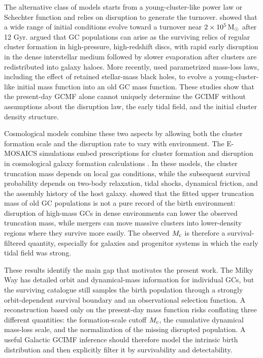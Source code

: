 \documentclass[fleqn,usenatbib]{mnras}
\begin{document}
The alternative class of models starts from a young-cluster-like power law or Schechter function and relies on disruption to generate the turnover. \citet{FallZhang2001} showed that a wide range of initial conditions evolve toward a turnover near $2\times10^5\,{\rm M}_\odot$ after 12 Gyr. \citet{Kruijssen2015} argued that GC populations can arise as the surviving relics of regular cluster formation in high-pressure, high-redshift discs, with rapid early disruption in the dense interstellar medium followed by slower evaporation after clusters are redistributed into galaxy haloes. More recently, \citet{GielesGnedin2023} used parametrized mass-loss laws, including the effect of retained stellar-mass black holes, to evolve a young-cluster-like initial mass function into an old GC mass function. These studies show that the present-day GCMF alone cannot uniquely determine the GCIMF without assumptions about the disruption law, the early tidal field, and the initial cluster density structure.

Cosmological models combine these two aspects by allowing both the cluster formation scale and the disruption rate to vary with environment. The E-MOSAICS simulations embed prescriptions for cluster formation and disruption in cosmological galaxy formation calculations \citep{Pfeffer2018}. In these models, the cluster truncation mass depends on local gas conditions, while the subsequent survival probability depends on two-body relaxation, tidal shocks, dynamical friction, and the assembly history of the host galaxy. \citet{Hughes2022} showed that the fitted upper truncation mass of old GC populations is not a pure record of the birth environment: disruption of high-mass GCs in dense environments can lower the observed truncation mass, while mergers can move massive clusters into lower-density regions where they survive more easily. The observed $M_{\rm c}$ is therefore a survival-filtered quantity, especially for galaxies and progenitor systems in which the early tidal field was strong.

These results identify the main gap that motivates the present work. The Milky Way has detailed orbit and dynamical-mass information for individual GCs, but the surviving catalogue still samples the birth population through a strongly orbit-dependent survival boundary and an observational selection function. A reconstruction based only on the present-day mass function risks conflating three different quantities: the formation-scale cutoff $M_{\rm c}$, the cumulative dynamical mass-loss scale, and the normalization of the missing disrupted population. A useful Galactic GCIMF inference should therefore model the intrinsic birth distribution and then explicitly filter it by survivability and detectability.
\end{document}
